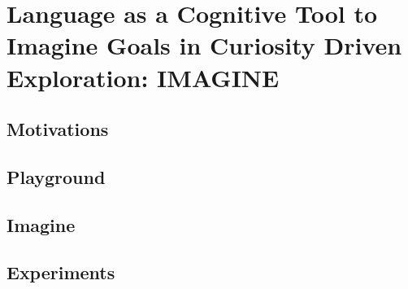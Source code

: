 \chapter{Language as a Cognitive Tool to Imagine Goals in Curiosity Driven Exploration: IMAGINE}

\section{Motivations}
\section{Playground}
\section{Imagine}
\section{Experiments}